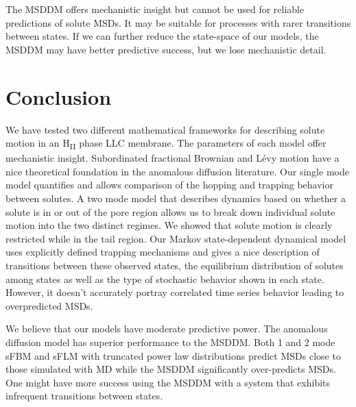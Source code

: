 \documentclass{article}
\begin{document}
  The MSDDM offers mechanistic insight but cannot be used for reliable predictions
  of solute MSDs. It may be suitable for processes with rarer transitions between 
  states. If we can further reduce the state-space of our models, the MSDDM
  may have better predictive success, but we lose mechanistic detail.
  

  \section{Conclusion}

  
  We have tested two different mathematical frameworks for describing solute
  motion in an H\textsubscript{II} phase LLC membrane. The parameters of each model offer mechanistic insight.
  Subordinated fractional Brownian and L\'evy motion have a nice theoretical 
  foundation in the anomalous diffusion literature. Our single mode model
  quantifies and allows comparison of the hopping and trapping behavior 
  between solutes. A two mode model that describes dynamics based on whether
  a solute is in or out of the pore region allows us to break down individual
  solute motion into the two distinct regimes. We showed that solute motion is
  clearly restricted while in the tail region. Our Markov state-dependent dynamical
  model uses explicitly defined trapping mechanisms and gives a nice description 
  of transitions between these observed states, the equilibrium distribution of 
  solutes among states as well as the type of stochastic behavior shown in each 
  state. However, it doesn't accurately portray correlated time series behavior
  leading to overpredicted MSDs.
  
  We believe that our models have moderate predictive power. The anomalous
  diffusion model has superior performance to the MSDDM. Both 1 and 2 mode 
  sFBM and sFLM with truncated power law distributions predict MSDs close 
  to those simulated with MD while the MSDDM significantly over-predicts MSDs.
  One might have more success using the MSDDM with a system that exhibits
  infrequent transitions between states.
\end{document}
